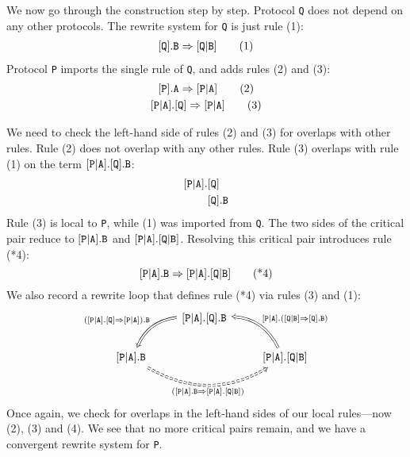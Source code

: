 \documentclass[../generics]{subfiles}
\begin{document}
\begin{example}
We now go through the construction step by step. Protocol \texttt{Q} does not depend on any other protocols. The rewrite system for \texttt{Q} is just rule (1):
\begin{gather*}
[\texttt{Q}].\texttt{B}\Rightarrow[\texttt{Q}|\texttt{B}]\tag{1}
\end{gather*}
Protocol \texttt{P} imports the single rule of \texttt{Q}, and adds rules (2) and (3):
\begin{gather*}
\AssocIntro{P}{A}\tag{2}\\
\ProtoConf{\assocsym{P}{A}}{Q}\tag{3}
\end{gather*}

We need to check the left-hand side of rules (2) and (3) for overlaps with other rules. Rule (2) does not overlap with any other rules. Rule (3) overlaps with rule (1) on the term $[\texttt{P}|\texttt{A}].[\texttt{Q}].\texttt{B}$:
\begin{align*}
[\texttt{P}|\texttt{A}].&[\texttt{Q}]\\
&[\texttt{Q}].\texttt{B}
\end{align*}
Rule (3) is local to \texttt{P}, while (1) was imported from \texttt{Q}. The two sides of the critical pair reduce to $[\texttt{P}|\texttt{A}].\texttt{B}$ and $[\texttt{P}|\texttt{A}].[\texttt{Q}|\texttt{B}]$. Resolving this critical pair introduces rule (*4):
\[
[\texttt{P}|\texttt{A}].\texttt{B}\Rightarrow[\texttt{P}|\texttt{A}].[\texttt{Q}|\texttt{B}]\tag{*4}
\]
We also record a rewrite loop that defines rule (*4) via rules (3) and (1):
\[
\begin{tikzcd}
&\assocsym{P}{A}.\protosym{Q}.\texttt{B}
\arrow[ld, Rightarrow, bend right, "(\ProtoConf{\assocsym{P}{A}}{Q}).\texttt{B}"']\\
\assocsym{P}{A}.\texttt{B}\arrow[rr, Rightarrow, bend right, dashed, "(\assocsym{P}{A}.\texttt{B}\Rightarrow\assocsym{P}{A}.\assocsym{Q}{B})"']
&&
\assocsym{P}{A}.\assocsym{Q}{B}\arrow[lu, Rightarrow, bend right, "\assocsym{P}{A}.(\AssocIntroInv{Q}{B})"']
\end{tikzcd}
\]
Once again, we check for overlaps in the left-hand sides of our local rules---now (2), (3) and (4). We see that no more critical pairs remain, and we have a convergent rewrite system for \texttt{P}.


\end{example}
\end{document}
